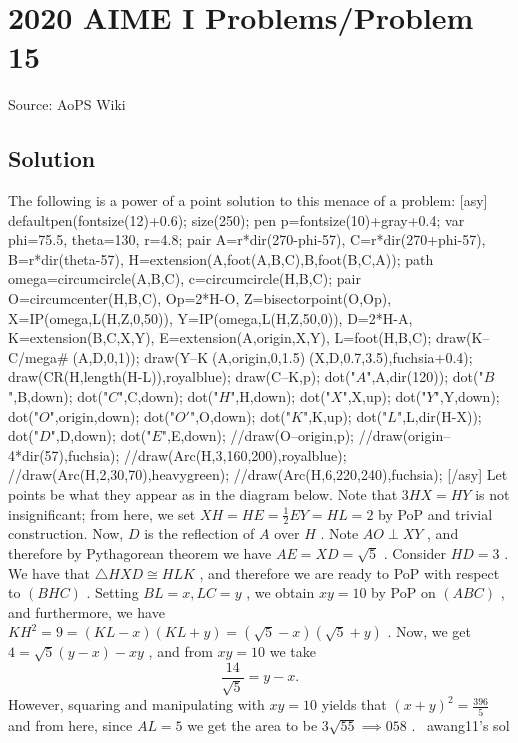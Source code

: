 \documentclass[12pt]{article}
\begin{document}
\section*{{2020 AIME I Problems/Problem 15}}
Source: AoPS Wiki

\subsection*{Solution}
The following is a power of a point solution to this menace of a problem: [asy] defaultpen(fontsize(12)+0.6); size(250); pen p=fontsize(10)+gray+0.4; var phi=75.5, theta=130, r=4.8; pair A=r*dir(270-phi-57), C=r*dir(270+phi-57), B=r*dir(theta-57), H=extension(A,foot(A,B,C),B,foot(B,C,A)); path omega=circumcircle(A,B,C), c=circumcircle(H,B,C); pair O=circumcenter(H,B,C), Op=2*H-O, Z=bisectorpoint(O,Op), X=IP(omega,L(H,Z,0,50)), Y=IP(omega,L(H,Z,50,0)), D=2*H-A, K=extension(B,C,X,Y), E=extension(A,origin,X,Y), L=foot(H,B,C); draw(K--C^^omega^^c^^L(A,D,0,1)); draw(Y--K^^L(A,origin,0,1.5)^^L(X,D,0.7,3.5),fuchsia+0.4); draw(CR(H,length(H-L)),royalblue); draw(C--K,p); dot("$A$",A,dir(120)); dot("$B$",B,down); dot("$C$",C,down); dot("$H$",H,down); dot("$X$",X,up); dot("$Y$",Y,down); dot("$O$",origin,down); dot("$O'$",O,down); dot("$K$",K,up); dot("$L$",L,dir(H-X)); dot("$D$",D,down); dot("$E$",E,down); //draw(O--origin,p); //draw(origin--4*dir(57),fuchsia); //draw(Arc(H,3,160,200),royalblue); //draw(Arc(H,2,30,70),heavygreen); //draw(Arc(H,6,220,240),fuchsia); [/asy] Let points be what they appear as in the diagram below. Note that $3HX = HY$ is not insignificant; from here, we set $XH = HE = \frac{1}{2} EY = HL = 2$ by PoP and trivial construction. Now, $D$ is the reflection of $A$ over $H$ . Note $AO \perp XY$ , and therefore by Pythagorean theorem we have $AE = XD = \sqrt{5}$ . Consider $HD = 3$ . We have that $\triangle HXD \cong HLK$ , and therefore we are ready to PoP with respect to $(BHC)$ . Setting $BL = x, LC = y$ , we obtain $xy = 10$ by PoP on $(ABC)$ , and furthermore, we have $KH^2 = 9 = (KL - x)(KL + y) = (\sqrt{5} - x)(\sqrt{5} + y)$ . Now, we get $4 = \sqrt{5}(y - x) - xy$ , and from $xy = 10$ we take \[\frac{14}{\sqrt{5}} = y - x.\] However, squaring and manipulating with $xy = 10$ yields that $(x + y)^2 = \frac{396}{5}$ and from here, since $AL = 5$ we get the area to be $3\sqrt{55} \implies \boxed{058}$ . ~awang11's sol
\end{document}
